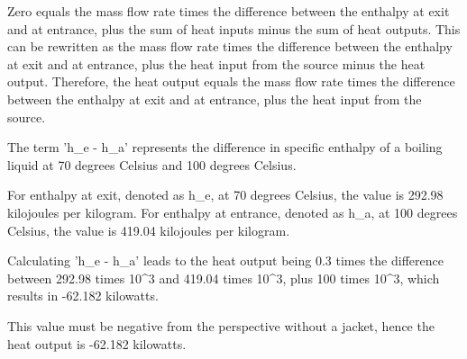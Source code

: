Zero equals the mass flow rate times the difference between the enthalpy at exit and at entrance, plus the sum of heat inputs minus the sum of heat outputs. This can be rewritten as the mass flow rate times the difference between the enthalpy at exit and at entrance, plus the heat input from the source minus the heat output. Therefore, the heat output equals the mass flow rate times the difference between the enthalpy at exit and at entrance, plus the heat input from the source.

The term 'h_e - h_a' represents the difference in specific enthalpy of a boiling liquid at 70 degrees Celsius and 100 degrees Celsius.

For enthalpy at exit, denoted as h_e, at 70 degrees Celsius, the value is 292.98 kilojoules per kilogram. For enthalpy at entrance, denoted as h_a, at 100 degrees Celsius, the value is 419.04 kilojoules per kilogram.

Calculating 'h_e - h_a' leads to the heat output being 0.3 times the difference between 292.98 times 10^3 and 419.04 times 10^3, plus 100 times 10^3, which results in -62.182 kilowatts.

This value must be negative from the perspective without a jacket, hence the heat output is -62.182 kilowatts.